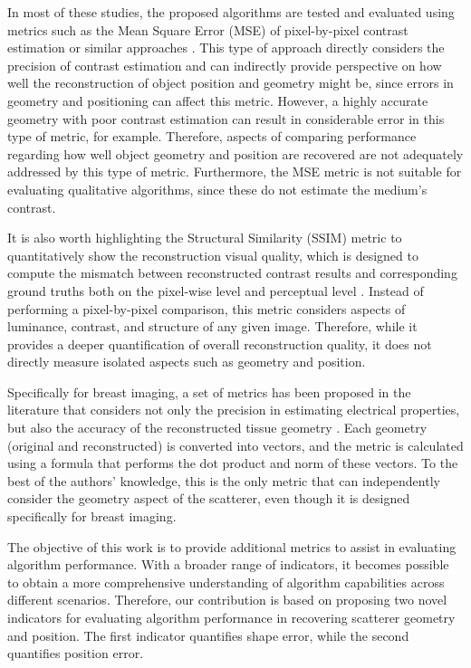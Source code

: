 \documentclass{IEEEtran}
\begin{document}
        In most of these studies, the proposed algorithms are tested and evaluated using metrics such as the Mean Square Error (MSE) of pixel-by-pixel contrast estimation or similar approaches \cite{yin2023subspace,zhang2023iterative,salucci2022learned,wang2023push,liu2022som,bevacqua2021simple,bevacqua2021effective}. This type of approach directly considers the precision of contrast estimation and can indirectly provide perspective on how well the reconstruction of object position and geometry might be, since errors in geometry and positioning can affect this metric. However, a highly accurate geometry with poor contrast estimation can result in considerable error in this type of metric, for example. Therefore, aspects of comparing performance regarding how well object geometry and position are recovered are not adequately addressed by this type of metric. Furthermore, the MSE metric is not suitable for evaluating qualitative algorithms, since these do not estimate the medium's contrast.

        It is also worth highlighting the Structural Similarity (SSIM) metric \cite{wang2004image} to quantitatively show the reconstruction visual quality, which is designed to compute the mismatch between reconstructed contrast results and corresponding ground truths both on the pixel-wise level and perceptual level \cite{wang2023push,liu2025exploring}. Instead of performing a pixel-by-pixel comparison, this metric considers aspects of luminance, contrast, and structure of any given image. Therefore, while it provides a deeper quantification of overall reconstruction quality, it does not directly measure isolated aspects such as geometry and position.

        Specifically for breast imaging, a set of metrics has been proposed in the literature that considers not only the precision in estimating electrical properties, but also the accuracy of the reconstructed tissue geometry \cite{kurrant2021evaluating}. Each geometry (original and reconstructed) is converted into vectors, and the metric is calculated using a formula that performs the dot product and norm of these vectors. To the best of the authors' knowledge, this is the only metric that can independently consider the geometry aspect of the scatterer, even though it is designed specifically for breast imaging.

        The objective of this work is to provide additional metrics to assist in evaluating algorithm performance. With a broader range of indicators, it becomes possible to obtain a more comprehensive understanding of algorithm capabilities across different scenarios. Therefore, our contribution is based on proposing two novel indicators for evaluating algorithm performance in recovering scatterer geometry and position. The first indicator quantifies shape error, while the second quantifies position error. 
\end{document}
